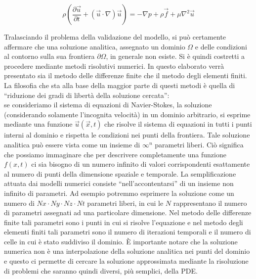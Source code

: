 \documentclass[italian]{article}
\begin{document}
\begin {equation*}
\rho(\frac{\partial \vec{u}}{\partial t}+(\vec{u}\cdot \nabla)\vec{u}) = -\nabla p + \rho \vec{f} + \mu \nabla^2 \vec{u}
\end{equation*}

Tralasciando il problema della validazione del modello, si può certamente affermare che una soluzione analitica, assegnato un dominio $\Omega$ e delle condizioni al contorno sulla sua frontiera $\partial \Omega$, in generale non esiste. Si è quindi costretti a procedere mediante metodi risolutivi numerici. In questo elaborato verrà presentato sia il metodo delle differenze finite che il metodo degli elementi finiti. La filosofia che sta alla base della maggior parte di questi metodi è quella di “riduzione dei gradi di libertà della soluzione cercata”:
\\se consideriamo il sistema di equazioni di Navier-Stokes, la soluzione (considerando solamente l’incognita velocità) in un dominio arbitrario, si esprime mediante una funzione $\vec{u}(\vec{x},t)$
che risolve il sistema di equazioni in tutti i punti interni al dominio e rispetta le condizioni nei punti della frontiera. Tale soluzione analitica può essere vista come un insieme di $\infty^n$ parametri liberi. Ciò significa che possiamo immaginare che per descrivere completamente una funzione $f(x,t)$ ci sia bisogno di un numero infinito di valori corrispondenti esattamente al numero di punti della dimensione spaziale e temporale. La semplificazione attuata dai modelli numerici consiste “nell’accontentarsi” di un insieme non infinito di parametri. Ad esempio potremmo esprimere la soluzione come un numero di $Nx \cdot Ny \cdot Nz \cdot Nt$ parametri liberi, in cui le $N$ rappresentano il numero di parametri assegnati ad una particolare dimensione. Nel metodo delle differenze finite tali parametri sono i punti in cui si risolve l’equazione e nel metodo degli elementi finiti tali parametri sono il numero di iterazioni temporali e il numero di celle in cui è stato suddiviso il dominio. È importante notare che la soluzione numerica non è  una interpolazione della soluzione analitica nei punti del dominio e questo ci permette di cercare la soluzione approssimata mediante la risoluzione di problemi che saranno quindi diversi, più semplici, della PDE.\\
\end{document}
